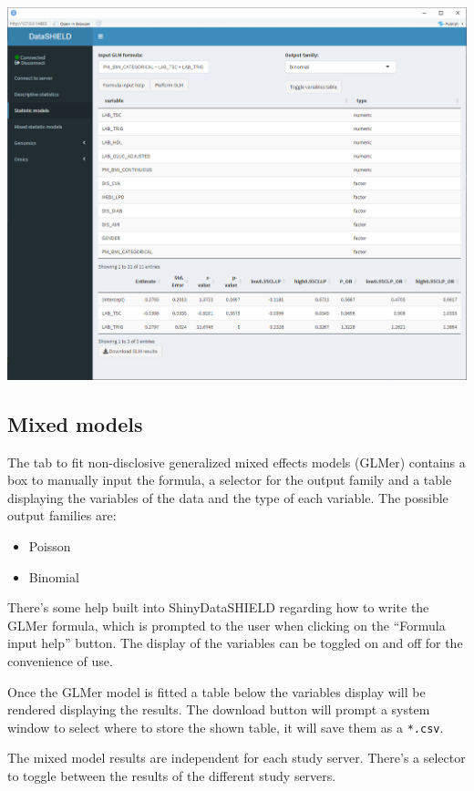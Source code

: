 \documentclass[
]{book}
\providecommand{\tightlist}{%
  \setlength{\itemsep}{0pt}\setlength{\parskip}{0pt}}
\begin{document}
\includegraphics{images/stat_models1.png}

\hypertarget{mixed-models}{%
\subsection{Mixed models}\label{mixed-models}}

The tab to fit non-disclosive generalized mixed effects models (GLMer) contains a box to manually input the formula, a selector for the output family and a table displaying the variables of the data and the type of each variable. The possible output families are:

\begin{itemize}
\tightlist
\item
  Poisson
\item
  Binomial
\end{itemize}

There's some help built into ShinyDataSHIELD regarding how to write the GLMer formula, which is prompted to the user when clicking on the ``Formula input help'' button. The display of the variables can be toggled on and off for the convenience of use.

Once the GLMer model is fitted a table below the variables display will be rendered displaying the results. The download button will prompt a system window to select where to store the shown table, it will save them as a \texttt{*.csv}.

The mixed model results are independent for each study server. There's a selector to toggle between the results of the different study servers.
\end{document}
